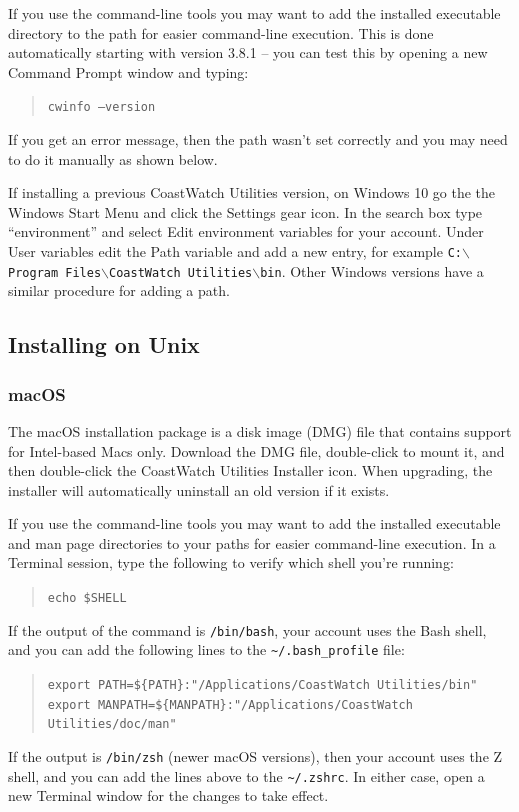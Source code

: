 If you use the command-line tools you may want to add the installed
executable directory to the path for easier command-line execution.  This is
done automatically starting with version 3.8.1 -- you can test this by opening
a new {\gui Command Prompt} window and typing:
\begin{quote}
  {\tt cwinfo --version}
\end{quote}
If you get an error message, then the path wasn't set correctly and you may
need to do it manually as shown below.

If installing a previous CoastWatch Utilities version, on Windows 10 go the 
the Windows {\gui Start Menu} and click the
{\gui Settings} gear icon.  In the search box type ``environment'' and select
{\gui Edit environment variables for your account}.  Under {\gui User variables}
edit the {\gui Path} variable and add a new entry, for example
{\tt C:$\backslash$Program Files$\backslash$CoastWatch Utilities$\backslash$bin}.
Other Windows versions have a similar procedure for adding a path.

\subsection{Installing on Unix}

\subsubsection{macOS}

The macOS installation package is a disk image (DMG) file that
contains support for Intel-based Macs only.  Download the DMG file,
double-click to mount it, and then
double-click the {\gui CoastWatch Utilities Installer} icon.
When upgrading, the installer will automatically uninstall an old version if
it exists.

If you use the command-line tools you may want to add the installed
executable and man page directories to your paths for easier command-line execution.
In a {\gui Terminal} session, type the following to verify which shell you're running:
\begin{quote}
  {\tt echo \$SHELL}
\end{quote}
If the output of the command is {\tt /bin/bash}, your account uses the Bash
shell, and you can add the following lines to the {\tt \~{ }/.bash\_profile}
file:
\begin{quote}
  {\tt export PATH=\$\{PATH\}:"/Applications/CoastWatch Utilities/bin"} \\
  {\tt export MANPATH=\$\{MANPATH\}:"/Applications/CoastWatch Utilities/doc/man"}
\end{quote}
If the output is {\tt /bin/zsh} (newer macOS versions), then your account uses 
the Z shell, and you can add the lines above to the {\tt \~{ }/.zshrc}.
In either case, open a new {\gui Terminal} window for the changes to take effect.

